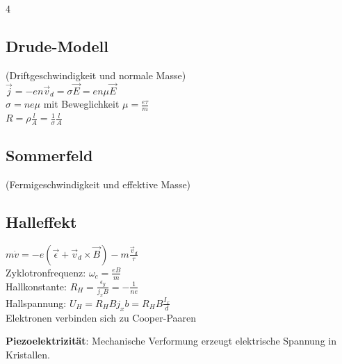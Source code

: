 \documentclass[fs, footer]{latex4ei_custom}
\begin{document}
\begin{multicols*}{4}
{		\subsection{Drude-Modell}
		(Driftgeschwindigkeit und normale Masse)\\
		$\vec j = -en\vec v_d = \sigma\vec E = en\mu\vec E$\\
		$\sigma = ne\mu$ mit Beweglichkeit $\mu = \frac{e\tau}{m}$\\
		$R = \rho \frac{l}{A} = \frac{1}{\sigma} \frac{l}{A}$

		\subsection{Sommerfeld}
		(Fermigeschwindigkeit und effektive Masse)\\

		\subsection{Halleffekt}
		$m\dot v = -e(\vec \epsilon + \vec v_d \times \vec B) - m \frac{\vec v_d}{\tau}$\\
		Zyklotronfrequenz: $\omega_c = \frac{eB}{m}$\\
		Hallkonstante: $R_H = \frac{\epsilon_y}{j_xB} = -\frac{1}{ne}$\\
		Hallspannung: $U_H = R_HBj_xb = R_HB\frac{I_x}{d}$\\

		Elektronen verbinden sich zu Cooper-Paaren

	}

	\textbf{Piezoelektrizität}: Mechanische Verformung erzeugt elektrische Spannung in Kristallen.\\



\end{multicols*}
\end{document}
